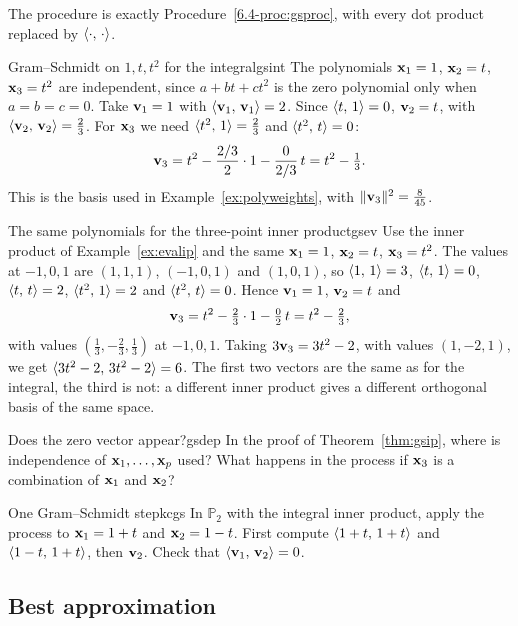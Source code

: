 \documentclass[11pt]{article}
\begin{document}
The procedure is exactly Procedure~\ref{6.4-proc:gsproc}, with every dot product replaced by $\langle \cdot,\,\cdot\rangle$.

\begin{exmp}{Gram--Schmidt on $1,t,t^2$ for the integral}{gsint}
The polynomials $\mathbf{x}_1=1$, $\mathbf{x}_2=t$, $\mathbf{x}_3=t^2$ are independent, since $a+bt+ct^2$ is the zero polynomial only when $a=b=c=0$. Take $\mathbf{v}_1=1$ with $\langle \mathbf{v}_1,\,\mathbf{v}_1\rangle=2$. Since $\langle t,\,1\rangle=0$, $\mathbf{v}_2=t$, with $\langle \mathbf{v}_2,\,\mathbf{v}_2\rangle=\tfrac23$. For $\mathbf{x}_3$ we need $\langle t^2,\,1\rangle=\tfrac23$ and $\langle t^2,\,t\rangle=0$:
\[
\mathbf{v}_3=t^2-\frac{2/3}{2}\cdot1-\frac{0}{2/3}\,t=t^2-\tfrac13 .
\]
This is the basis used in Example~\ref{ex:polyweights}, with $\lVert\mathbf{v}_3\rVert^2=\tfrac8{45}$.
\end{exmp}

\begin{exmp}{The same polynomials for the three-point inner product}{gsev}
Use the inner product of Example~\ref{ex:evalip} and the same $\mathbf{x}_1=1$, $\mathbf{x}_2=t$, $\mathbf{x}_3=t^2$. The values at $-1,0,1$ are $(1,1,1)$, $(-1,0,1)$ and $(1,0,1)$, so $\langle 1,\,1\rangle=3$, $\langle t,\,1\rangle=0$, $\langle t,\,t\rangle=2$, $\langle t^2,\,1\rangle=2$ and $\langle t^2,\,t\rangle=0$. Hence $\mathbf{v}_1=1$, $\mathbf{v}_2=t$ and
\[
\mathbf{v}_3=t^2-\tfrac23\cdot1-\tfrac02\,t=t^2-\tfrac23 ,
\]
with values $(\tfrac13,-\tfrac23,\tfrac13)$ at $-1,0,1$. Taking $3\mathbf{v}_3=3t^2-2$, with values $(1,-2,1)$, we get $\langle 3t^2-2,\,3t^2-2\rangle=6$. The first two vectors are the same as for the integral, the third is not: a different inner product gives a different orthogonal basis of the same space.
\end{exmp}

\begin{think}{Does the zero vector appear?}{gsdep}
In the proof of Theorem~\ref{thm:gsip}, where is independence of $\mathbf{x}_1,\dots,\mathbf{x}_p$ used? What happens in the process if $\mathbf{x}_3$ is a combination of $\mathbf{x}_1$ and $\mathbf{x}_2$?
\end{think}

\begin{kc}{One Gram--Schmidt step}{kcgs}
In $\mathbb{P}_2$ with the integral inner product, apply the process to $\mathbf{x}_1=1+t$ and $\mathbf{x}_2=1-t$. First compute $\langle 1+t,\,1+t\rangle$ and $\langle 1-t,\,1+t\rangle$, then $\mathbf{v}_2$. Check that $\langle \mathbf{v}_1,\,\mathbf{v}_2\rangle=0$.
\end{kc}

\subsection*{Best approximation}
\end{document}

